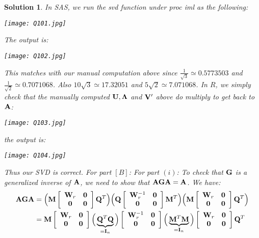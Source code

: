 \documentclass[11pt]{article}
\newtheorem{sol}{Solution}
\begin{document}
\begin{sol}
	 In SAS, we run the svd function under proc iml as the following:
	 \begin{center}
	 	\texttt{[image: Q101.jpg]}
	 \end{center}
	 The output is:
	  \begin{center}
	 	\texttt{[image: Q102.jpg]}
	 \end{center}
	 This matches with our manual computation above since $\frac{1}{\sqrt{3}}\simeq 0.5773503$ and $\frac{1}{\sqrt{2}} \simeq 0.7071068$. Also $10\sqrt{3} \simeq 17.32051$ and $5\sqrt{2} \simeq 7.071068$.\vskip 2mm
	 In $R$, we simply check that the manually computed ${\bf U}, {\bf \Lambda}$ and ${\bf V}'$ above do multiply to get back to ${\bf A}$:
	  \begin{center}
	 	\texttt{[image: Q103.jpg]}
	 \end{center}
	 the output is:
	  \begin{center}
	 	\texttt{[image: Q104.jpg]}
	 \end{center}
	 Thus our SVD is correct.\vskip 2mm
	 For part $[B]$:\vskip 2mm
	 For part $(i)$:\vskip 2mm
	 To check that ${\bf G}$ is a generalized inverse of ${\bf A}$, we need to show that ${\bf A}{\bf G}{\bf A} = {\bf A}$.\vskip 2mm
	 We have:
	 \begin{align*}
	 	{\bf A}{\bf G}{\bf A} &= \Big({\bf M}\left[\begin{array}{cc} {\bf W}_r&{\bf 0} \\ {\bf 0}&{\bf 0} \end{array}\right]{\bf Q}^T\Big)\Big({\bf Q}\left[\begin{array}{cc} {\bf W}^{-1}_r&{\bf 0} \\ {\bf 0}&{\bf 0} \end{array}\right]{\bf M}^T\Big)\Big({\bf M}\left[\begin{array}{cc} {\bf W}_r&{\bf 0} \\{\bf 0}&{\bf 0}  \end{array}\right]{\bf Q}^T\Big)\\
	 	&= {\bf M}\left[\begin{array}{cc} {\bf W}_r&{\bf 0} \\ {\bf 0}&{\bf 0} \end{array}\right]\Big(\underbrace{{\bf Q}^T{\bf Q}}_{= {\bf I}_n}\Big)\left[\begin{array}{cc} {\bf W}^{-1}_r&{\bf 0} \\ {\bf 0}&{\bf 0} \end{array}\right]\Big(\underbrace{{\bf M}^T{\bf M}}_{ = {\bf I}_n}\Big)\left[\begin{array}{cc} {\bf W}_r&{\bf 0} \\{\bf 0}&{\bf 0}  \end{array}\right]{\bf Q}^T\\

\end{align*}
\end{sol}
\end{document}

